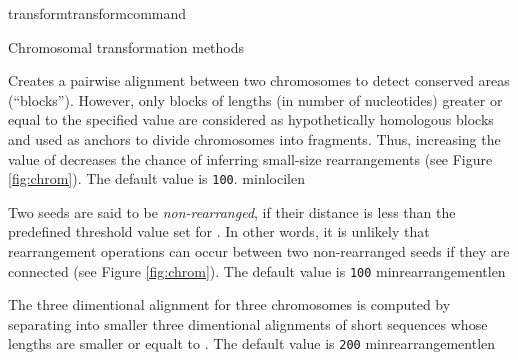 \begin{command}{transform}{transformcommand}
\begin{arguments}
\begin{argumentgroup}{Chromosomal transformation methods}
\begin{description}
                          {Creates a pairwise alignment between two chromosomes to
                          detect conserved areas (``blocks''). However, only blocks of
                          lengths (in number of nucleotides) greater or equal to the specified 
                          value are considered as hypothetically
                          homologous blocks and used as anchors to divide chromosomes into
                          fragments. Thus, increasing the value of  decreases
                           the chance of inferring small-size rearrangements (see Figure \ref{fig:chrom}). 
                           The default value is \texttt{100}.} 
                           {minlocilen}
                           
                            {Two seeds are said to be \emph{non-rearranged}, 
               	           if their distance is less than the predefined threshold value set
	                    for .  In other words, it is unlikely 
	                    that rearrangement operations can occur between two non-rearranged seeds
	                    if they are connected (see Figure \ref{fig:chrom}).
	                    The default value is \texttt{100}}
                             {minrearrangementlen}


                            {The three dimentional alignment for three chromosomes
                            is computed by separating into smaller three dimentional
                            alignments of short sequences whose lengths are smaller 
                            or equalt to . The default value
                             is \texttt{200}}
                             {minrearrangementlen}



\end{description}
\end{argumentgroup}
\end{arguments}
\end{command}
